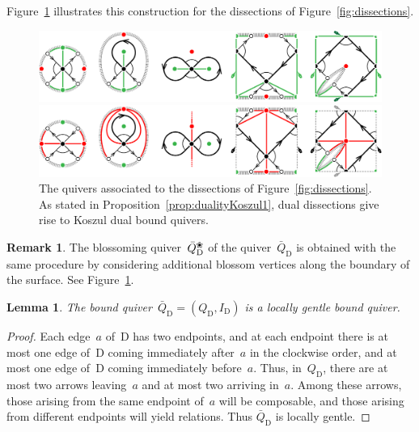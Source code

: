 \documentclass{amsart}
\newtheorem{lemma}[theorem]{Lemma}
\theoremstyle{definition}
\newtheorem{remark}[theorem]{Remark}
\newcommand{\fref}[1]{Figure~\ref{#1}} %
\newcommand{\blossom}{^\text{\ding{96}}} %
\newcommand{\dissection}{\mathrm{D}} %
\begin{document}
\fref{fig:quiversDissections} illustrates this construction for the dissections of \fref{fig:dissections}.

\begin{figure}[t]
	\capstart
	\centerline{\includegraphics[scale=.7]{quiversDissections1}}
	\medskip
	\centerline{\includegraphics[scale=.7]{quiversDissections2}}
	\caption{The quivers associated to the dissections of \fref{fig:dissections}. As stated in Proposition~\ref{prop:dualityKoszul1}, dual dissections give rise to Koszul dual bound quivers.}
	\label{fig:quiversDissections}
\end{figure}

\begin{remark}
The blossoming quiver~$\bar Q_\dissection\blossom$ of the quiver~$\bar Q_\dissection$ is obtained with the same procedure by considering additional blossom vertices along the boundary of the surface. See \fref{fig:quiversDissections}.
\end{remark}

\begin{lemma}
\label{lemm:quiverOfDissectionIsLocallyGentle}
The bound quiver~$\bar Q_{\dissection} = (Q_{\dissection}, I_{\dissection})$ is a locally gentle bound quiver.
\end{lemma}
\begin{proof}
Each edge~$a$ of~$\dissection$ has two endpoints, and at each endpoint there is at most one edge of~$\dissection$ coming immediately after~$a$ in the clockwise order, and at most one edge of~$\dissection$ coming immediately before~$a$.
Thus, in~$Q_{\dissection}$, there are at most two arrows leaving~$a$ and at most two arriving in~$a$.
Among these arrows, those arising from the same endpoint of~$a$ will be composable, and those arising from different endpoints will yield relations.
Thus $\bar Q_{\dissection}$ is locally gentle.
\end{proof}
\end{document}
